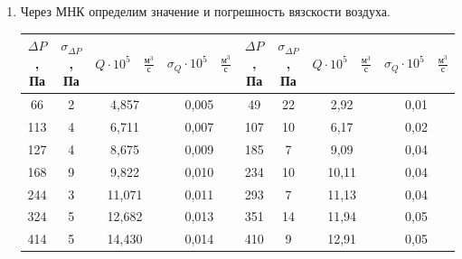 \documentclass[11pt,a4paper]{article}
\begin{document}
\begin{enumerate}
\item Через МНК определим значение и погрешность вязскости воздуха.

\begin{table}[]
\centering
\begin{tabular}{|c|c|c|c|c|c|c|c|}
\hline
$ \Delta P $, Па & $ \sigma_{\Delta P} $, Па & $ Q \cdot 10^{5} \quad \frac{\text{м}^{3}}{\text{с}}$ & $\sigma_{Q}\cdot 10^5 \quad \frac{\text{м}^{3}}{\text{с}} $ & $ \Delta P $, Па & $ \sigma_{\Delta P} $, Па & $ Q \cdot 10^{5} \quad \frac{\text{м}^{3}}{\text{с}}$ & $\sigma_{Q}\cdot 10^5 \quad \frac{\text{м}^{3}}{\text{с}} $ \\ \hline
66             & 2                       & 4,857                                          & 0,005                                                  & 49                              & 22                  & 2,92           & 0,01                   \\ \hline
113            & 4                       & 6,711                                          & 0,007                                                  & 107                             & 10                  & 6,17           & 0,02                   \\ \hline
127            & 4                       & 8,675                                          & 0,009                                                  & 185                             & 7                   & 9,09           & 0,04                   \\ \hline
168            & 9                       & 9,822                                          & 0,010                                                  & 234                             & 10                  & 10,11          & 0,04                   \\ \hline
244            & 3                       & 11,071                                         & 0,011                                                  & 293                             & 7                   & 11,13          & 0,04                   \\ \hline
324            & 5                       & 12,682                                         & 0,013                                                  & 351                             & 14                  & 11,94          & 0,05                   \\ \hline
414            & 5                       & 14,430                                         & 0,014                                                  & 410                             & 9                   & 12,91          & 0,05                   \\ \hline

\end{tabular}
\end{table}
\end{enumerate}
\end{document}
